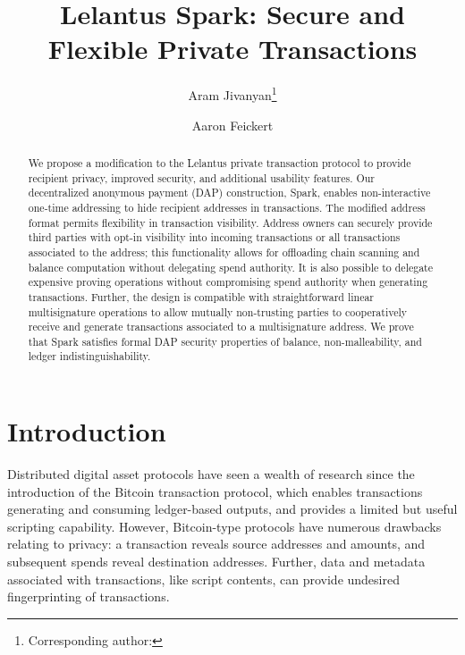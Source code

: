 \documentclass{llncs}
\begin{document}
\title{Lelantus Spark: Secure and Flexible Private Transactions}
\author{Aram Jivanyan\thanks{Corresponding author: } \and Aaron Feickert}
\maketitle

\begin{abstract}
    We propose a modification to the Lelantus private transaction protocol to provide recipient privacy, improved security, and additional usability features.
    Our decentralized anonymous payment (DAP) construction, Spark, enables non-interactive one-time addressing to hide recipient addresses in transactions.
    The modified address format permits flexibility in transaction visibility.
    Address owners can securely provide third parties with opt-in visibility into incoming transactions or all transactions associated to the address; this functionality allows for offloading chain scanning and balance computation without delegating spend authority.
    It is also possible to delegate expensive proving operations without compromising spend authority when generating transactions.
    Further, the design is compatible with straightforward linear multisignature operations to allow mutually non-trusting parties to cooperatively receive and generate transactions associated to a multisignature address.
    We prove that Spark satisfies formal DAP security properties of balance, non-malleability, and ledger indistinguishability.
\end{abstract}


\section{Introduction}

Distributed digital asset protocols have seen a wealth of research since the introduction of the Bitcoin transaction protocol, which enables transactions generating and consuming ledger-based outputs, and provides a limited but useful scripting capability.
However, Bitcoin-type protocols have numerous drawbacks relating to privacy: a transaction reveals source addresses and amounts, and subsequent spends reveal destination addresses.
Further, data and metadata associated with transactions, like script contents, can provide undesired fingerprinting of transactions.
\end{document}
